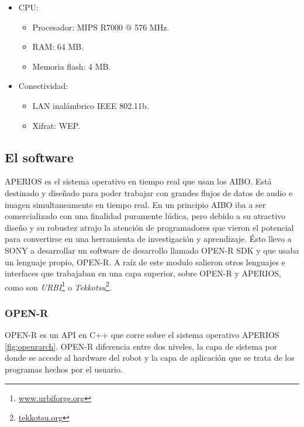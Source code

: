 \documentclass[12pt,a4paper,final,twoside]{book}
\begin{document}
\begin{itemize}
\begin{itemize}
\item Altura: 278 mm.
\item Largo: 319 mm.
\item Ancho: 180 mm.
\item Peso con batería: 1.65 Kg. 
\end{itemize}
\item CPU:
\begin{itemize}
\item Procesador: MIPS R7000 @ 576 MHz.
\item RAM: 64 MB.
\item Memoria flash: 4 MB.
\end{itemize}
\end{itemize}
\begin{itemize}
\item Conectividad:
\begin{itemize}
\item LAN inalámbrico IEEE 802.11b.
\item Xifrat: WEP.
\end{itemize}
\end{itemize}

\subsection{El software}
APERIOS es el sistema operativo en tiempo real que usan los AIBO. Está destinado y diseñado para poder trabajar con grandes flujos de datos de audio e imagen simultaneamente en tiempo real.
En un principio AIBO iba a ser comercializado con una finalidad puramente lúdica, pero debido a su atractivo diseño y su robustez atrajo la atención de programadores que vieron el potencial para convertirse en una herramienta de investigación y aprendizaje. Ésto llevo a SONY a desarrollar un software de desarrollo llamado OPEN-R SDK y que usaba un lenguaje propio, OPEN-R. A raíz de este modulo salieron otros lenguajes e interfaces que trabajaban en una capa superior, sobre OPEN-R y APERIOS, como son \textit{URBI}\footnote{\url{www.urbiforge.org}} o \textit{Tekkotsu}\footnote{\url{tekkotsu.org}}.

\subsubsection{OPEN-R}
OPEN-R es un API en C++ que corre sobre el sistema operativo APERIOS \ref{fig:openrarch}. OPEN-R diferencia entre dos niveles, la capa de sistema por donde se accede al hardware del robot y la capa de aplicación que se trata de los programas hechos por el usuario.
\end{document}
